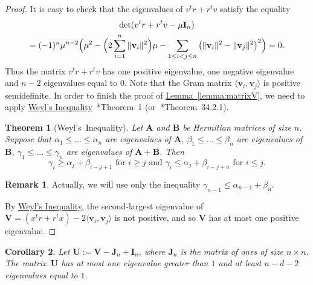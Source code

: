 \documentclass[a4paper, oneside, reqno, 12pt]{amsart}
\theoremstyle{plain}
\newtheorem{theorem}{Theorem}
\newtheorem{corollary}[theorem]{Corollary}
\theoremstyle{definition}
\newtheorem*{remark*}{Remark}
\begin{document}
\begin{proof}
It is easy to check that the eigenvalues of $v^t r +r^t v$ satisfy the equality
\begin{gather*}
\det (v^t r+r^t v-\mu \mathbf I_n)\\
=(-1)^n\mu^{n-2}\Bigl(\mu^2-\Bigl(2\sum_{i=1}^n \|\mathbf v_i\|^2\Bigr)\mu -\sum_{1\leq i<j\leq n} \left(\|\mathbf v_i\|^2-\|\mathbf v_j\|^2\right)^2\Bigr)=0.
\end{gather*}
Thus the matrix $v^tr+r^tv$ has one positive eigenvalue, one negative eigenvalue and $n-2$ eigenvalues equal to $0$.
Note that the Gram matrix $\langle\mathbf v_i, \mathbf v_j\rangle$ 
is positive semidefinite. In order to finish the proof of \hyperref[lemma:matrixV]{Lemma~\ref*{lemma:matrixV}}, we need to apply \hyperref[theorem:sumofHermitian]{Weyl's Inequality}~\cite{W1912}*{Theorem~1} (or~\cite{Pr94}*{Theorem~34.2.1}).
\begin{theorem}[Weyl's~Inequality]
\label{theorem:sumofHermitian}
Let $\mathbf A$ and $\mathbf B$ be Hermitian matrices of size $n$. Suppose that $\alpha_1\leq \dots\leq \alpha_n$ are eigenvalues of $\mathbf A$, $\beta_1\leq \dots \leq \beta_n$ are eigenvalues of $\mathbf B$, $\gamma_1\leq \dots \leq \gamma_n$ are eigenvalues of $\mathbf A+\mathbf B$. Then $$\gamma_{i}\geq \alpha_j+\beta_{i-j+1} \text{ for } i\geq j \text{ and } \gamma_{i}\leq \alpha_{j}+\beta_{i-j+n} \text{ for } i\leq j.$$
\end{theorem}
\begin{remark*}
Actually, we will use only the inequality $\gamma_{n-1}\leq \alpha_{n-1}+\beta_n$.
\end{remark*}
By \hyperref[theorem:sumofHermitian]{Weyl's Inequality}, the second-largest eigenvalue of $\mathbf V=(x^tr+r^tx)-2\langle\mathbf v_i, \mathbf v_j\rangle$ is not positive, and so $\mathbf V$ has at most one positive eigenvalue. %
\end{proof}
\begin{corollary}\label{corollary:U}
Let $\mathbf U:=\mathbf V-\mathbf J_n+\mathbf I_n$, where $\mathbf J_n$ is the matrix of ones of size $n\times n$. The matrix~$\mathbf U$ has at most one eigenvalue greater than $1$ and at least $n-d-2$ eigenvalues equal to $1$. 
\end{corollary}
\end{document}
